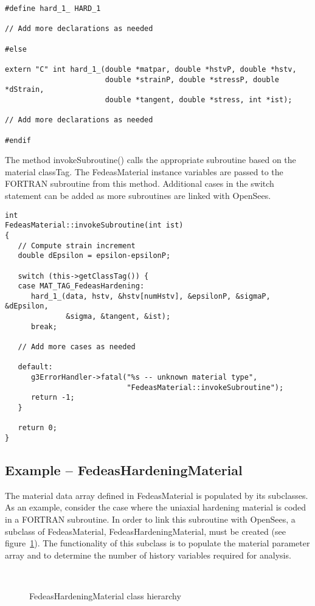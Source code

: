 \documentclass[12pt]{article}
\begin{document}
{{\begin{verbatim}
#define hard_1_ HARD_1

// Add more declarations as needed

#else

extern "C" int hard_1_(double *matpar, double *hstvP, double *hstv,
                       double *strainP, double *stressP, double *dStrain,
                       double *tangent, double *stress, int *ist);

// Add more declarations as needed

#endif
\end{verbatim}
}

\noindent The method invokeSubroutine() calls the appropriate subroutine based
on the material classTag. The FedeasMaterial instance variables are passed to the
FORTRAN subroutine from this method. Additional cases in the switch statement can
be added as more subroutines are linked with OpenSees.

{\sf\small
\begin{verbatim}
int
FedeasMaterial::invokeSubroutine(int ist)
{
   // Compute strain increment
   double dEpsilon = epsilon-epsilonP;
     
   switch (this->getClassTag()) {
   case MAT_TAG_FedeasHardening:
      hard_1_(data, hstv, &hstv[numHstv], &epsilonP, &sigmaP, &dEpsilon, 
              &sigma, &tangent, &ist);
      break;
       
   // Add more cases as needed

   default:
      g3ErrorHandler->fatal("%s -- unknown material type",
                            "FedeasMaterial::invokeSubroutine");
      return -1;
   }
     
   return 0;
}
\end{verbatim}
}

\subsection{Example -- FedeasHardeningMaterial}
The material data array defined in FedeasMaterial is populated by its subclasses.
As an example, consider the case where the uniaxial hardening material is
coded in a FORTRAN subroutine. In order to link this subroutine with OpenSees, a
subclass of FedeasMaterial, FedeasHardeningMaterial, must be created
(see figure~\ref{fig:FedeasHardening}). The functionality
of this subclass is to populate the material parameter array and to determine the
number of history variables required for analysis.

\begin{figure}[htpb]
\begin{center}
\leavevmode
\hbox{%
}
\end{center}
\caption{FedeasHardeningMaterial class hierarchy}
\label{fig:FedeasHardening}
\end{figure}

}
\end{document}
